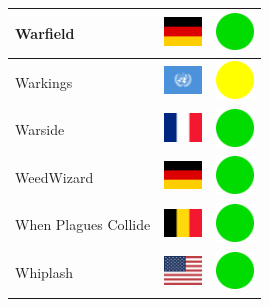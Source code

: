 \documentclass[12pt, a4paper, twoside]{report}
\begin{document}
\begin{center}
\begin{longtable}{|p{5cm}|p{2cm}|p{2cm}|}
Warfield & \includegraphics[width=1cm]{4x3/de} & \includegraphics[width=1cm]{likes/y} \\ \hline
Warkings & \includegraphics[width=1cm]{4x3/un} & \includegraphics[width=1cm]{likes/m} \\ \hline
Warside & \includegraphics[width=1cm]{4x3/fr} & \includegraphics[width=1cm]{likes/y} \\ \hline
WeedWizard & \includegraphics[width=1cm]{4x3/de} & \includegraphics[width=1cm]{likes/y} \\ \hline
When Plagues Collide & \includegraphics[width=1cm]{4x3/be} & \includegraphics[width=1cm]{likes/y} \\ \hline
Whiplash & \includegraphics[width=1cm]{4x3/us} & \includegraphics[width=1cm]{likes/y} \\ \hline

\end{longtable}
\end{center}
\end{document}
